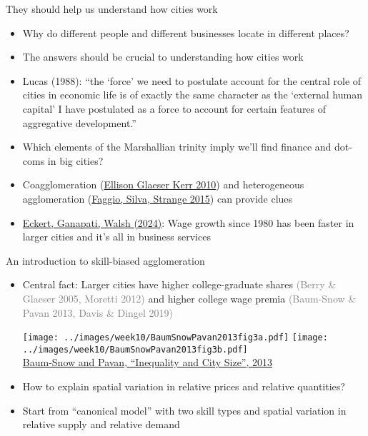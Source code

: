 \documentclass[11pt,notes=hide,aspectratio=169]{beamer}
\begin{document}
\begin{frame}{They should help us understand how cities work}
\begin{itemize}
	\item Why do different people and different businesses locate in different places?
	\item The answers should be crucial to understanding how cities work
\item Lucas (1988): ``the `force' we need to postulate account for the central role of cities in economic life is of exactly the same character as the `external human capital' I have postulated as a force to account for certain features of aggregative development.''
	\item Which elements of the Marshallian trinity imply we'll find finance and dot-coms in big cities?
	\item Coagglomeration (\href{https://www.aeaweb.org/articles.php?doi=10.1257/aer.100.3.1195}{Ellison Glaeser Kerr 2010}) and heterogeneous agglomeration (\href{https://ideas.repec.org/p/ehl/lserod/58426.html}{Faggio, Silva, Strange 2015}) can provide clues
	\item \href{https://www.conor-walsh.com/s/EGW.pdf}{Eckert, Ganapati, Walsh (2024)}: Wage growth since 1980 has been faster in larger cities and it's all in business services
\end{itemize}
\end{frame}
\begin{frame}{An introduction to skill-biased agglomeration}
\begin{itemize}
	\item Central fact:
Larger cities have 
higher college-graduate shares
\textcolor{gray}{(Berry \& Glaeser 2005, Moretti 2012)}
and
higher college wage premia
\textcolor{gray}{(Baum-Snow \& Pavan 2013, Davis \& Dingel 2019)}
\begin{center}
\texttt{[image: ../images/week10/BaumSnowPavan2013fig3a.pdf]}
\texttt{[image: ../images/week10/BaumSnowPavan2013fig3b.pdf]}\\
{ \footnotesize \href{http://www.mitpressjournals.org/doi/pdf/10.1162/REST_a_00328}{Baum-Snow and Pavan, ``Inequality and City Size'', 2013}}
\end{center}
\item How to explain spatial variation in relative prices and relative quantities?
\item {Start from ``canonical model'' with two skill types and spatial variation in relative supply and relative demand\par}
\end{itemize}
\end{frame}
\end{document}
